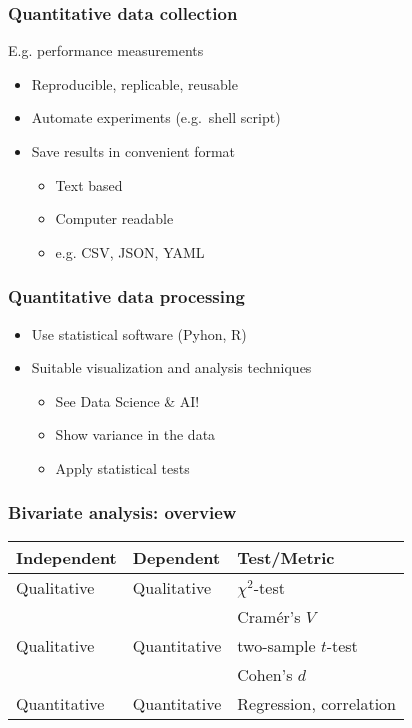 \documentclass[aspectratio=169]{beamer}
\begin{document}
\begin{frame}
  \frametitle{Quantitative data collection}

  E.g. performance measurements

  \begin{itemize}
    \item Reproducible, replicable, reusable
    \item Automate experiments (e.g.\ shell script)
    \item Save results in convenient format
    \begin{itemize}
        \item Text based
        \item Computer readable
        \item e.g. CSV, JSON, YAML
    \end{itemize}
  \end{itemize}

\end{frame}

\begin{frame}
  \frametitle{Quantitative data processing}

  \begin{itemize}
    \item Use statistical software (Pyhon, R)
    \item Suitable visualization and analysis techniques
    \begin{itemize}
        \item See Data Science \& AI!
        \item Show variance in the data
        \item Apply statistical tests
    \end{itemize}
  \end{itemize}

\end{frame}
  
\begin{frame}
  \frametitle{Bivariate analysis: overview}
  \centering
  \begin{tabular}{lll}
    \toprule
    \textbf{Independent} & \textbf{Dependent} & \textbf{Test/Metric}    \\
    \midrule
    Qualitative          & Qualitative        & $\chi^2$-test           \\
                         &                    & Cramér's $V$            \\
    Qualitative          & Quantitative       & two-sample $t$-test     \\
                         &                    & Cohen's $d$             \\
    Quantitative         & Quantitative       & Regression, correlation \\
    \bottomrule
  \end{tabular}

  \bigskip

\end{frame}
\end{document}
